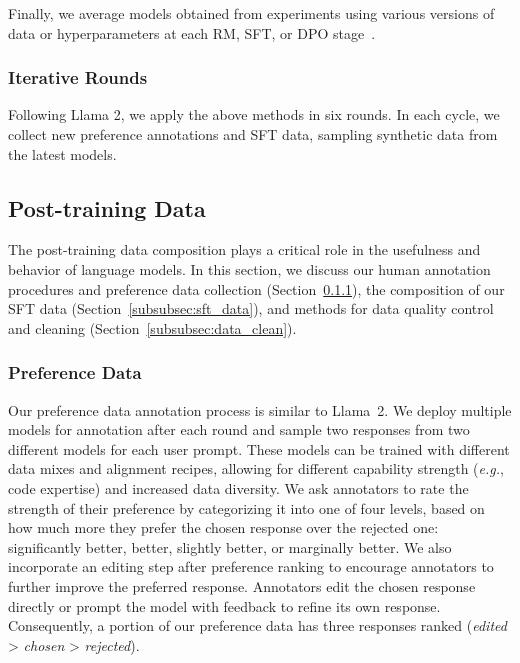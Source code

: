 \documentclass[dvipsnames]{fairmeta}
\begin{document}
Finally, we average models obtained from experiments using various versions of data or hyperparameters at each RM, SFT, or DPO stage~\citep{izmailov2019averagingweightsleadswider,wortsman2022modelsoupsaveragingweights, li2022branchtrainmergeembarrassinglyparalleltraining}. 

\subsubsection{Iterative Rounds}

Following Llama 2, we apply the above methods in six rounds. In each cycle, we collect new preference annotations and SFT data, sampling synthetic data from the latest models. 

\subsection{Post-training Data}
\label{sec:finetuning_data}

The post-training data composition plays a critical role in the usefulness and behavior of language models. In this section, we discuss our human annotation procedures and preference data collection (Section~\ref{sec:rlhf_annotation_data}), the composition of our SFT data (Section~\ref{subsubsec:sft_data}), and methods for data quality control and cleaning (Section~\ref{subsubsec:data_clean}).

\subsubsection{Preference Data} 
\label{sec:rlhf_annotation_data}

Our preference data annotation process is similar to Llama~2. We deploy multiple models for annotation after each round and sample two responses from two different models for each user prompt. These models can be trained with different data mixes and alignment recipes, allowing for different capability strength (\emph{e.g.}, code expertise) and increased data diversity. We ask annotators to rate the strength of their preference by categorizing it into one of four levels, based on how much more they prefer the chosen response over the rejected one: significantly better, better, slightly better, or marginally better. We also incorporate an editing step after preference ranking to encourage annotators to further improve the preferred response. Annotators edit the chosen response directly or prompt the model with feedback to refine its own response. Consequently, a portion of our preference data has three responses ranked (\emph{edited} > \emph{chosen} > \emph{rejected}).
\end{document}

